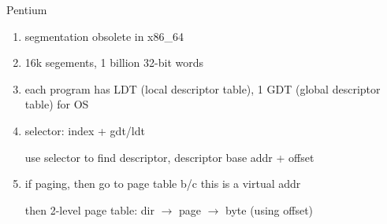 \documentclass[11pt]{article}
\begin{document}
Pentium
\begin{enumerate}
    \item segmentation obsolete in x86\_64
    \item 16k segements, 1 billion 32-bit words
    \item each program has LDT (local descriptor table), 1 GDT (global descriptor table) for OS
    \item selector: index + gdt/ldt

        use selector to find descriptor, descriptor base addr + offset

    \item if paging, then go to page table b/c this is a virtual addr

        then 2-level page table: dir $\to$ page $\to$ byte (using offset)
\end{enumerate}
\end{document}

